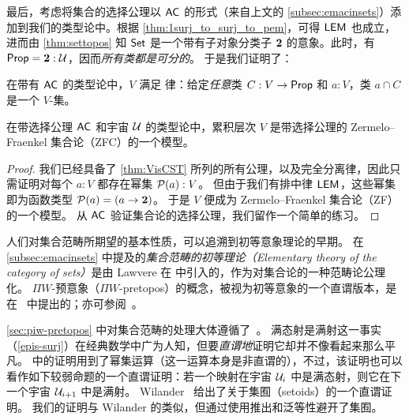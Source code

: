 最后，考虑将集合的选择公理以 $\mathsf{AC}_{}$ 的形式（来自上文的 \cref{subsec:emacinsets}）添加到我们的类型论中。根据 \cref{thm:1surj_to_surj_to_pem}，可得 $\mathsf{LEM}_{}$ 也成立，进而由 \cref{thm:settopos} 知 $\mathsf{Set}$ 是一个带有子对象分类子 $\mathbf{2}$ 的意象。此时，有 $\mathsf{Prop} = \mathbf{2}:\mathcal{U}$，因而\emph{所有类都是可分的}。
于是我们证明了：

\begin{lem}\label{lem:fullsep}
  在带有 $\mathsf{AC}_{}$ 的类型论中，$V$ 满足 
  律：给定\emph{任意}类 $C : V \to \mathsf{Prop}$ 和 $a : V$，类 $a \cap C$ 是一个 $V$-集。
\end{lem}

\begin{thm}\label{thm:zfc}
在带选择公理 $\mathsf{AC}_{}$ 和宇宙 $\mathcal{U}$ 的类型论中，累积层次 $V$ 是带选择公理的 Zermelo--Fraenkel 集合论（ZFC）的一个模型。
\end{thm}

\begin{proof}
我们已经具备了 \cref{thm:VisCST} 所列的所有公理，以及完全分离律，因此只需证明对每个 $a:V$ 都存在幂集 $\mathcal{P}(a):V$。
但由于我们有排中律 $\mathsf{LEM}_{}$，这些幂集即为函数类型 $\mathcal{P}(a) = (a\to\mathbf{2})$。
于是 $V$ 便成为 Zermelo--Fraenkel 集合论（ZF）的一个模型。
从 $\mathsf{AC}_{}$ 验证集合论的选择公理，我们留作一个简单的练习。
\end{proof}

%

\sectionNotes

人们对集合范畴所期望的基本性质，可以追溯到初等意象理论的早期。
在 \cref{subsec:emacinsets} 中提及的\emph{集合范畴的初等理论（Elementary theory of the category of sets）}是由 Lawvere 在 \cite{lawvere:etcs-long} 中引入的，作为对集合论的一种范畴论公理化。
%
$\Pi W$-预意象（$\Pi W$-pretopos）的概念，被视为初等意象的一个直谓版本，是在~\cite{MoerdijkPalmgren2002} 中提出的；亦可参阅~\cite{palmgren:cetcs}。

\cref{sec:piw-pretopos} 中对集合范畴的处理大体遵循了~\cite{RijkeSpitters}。
满态射是满射这一事实（\cref{epis-surj}）在经典数学中广为人知，但要\emph{直谓地}证明它却并不像看起来那么平凡。
%
\cite{Mines/R/R:1988} 中的证明用到了幂集运算（这一运算本身是非直谓的），不过，该证明也可以看作如下较弱命题的一个直谓证明：若一个映射在宇宙 $\mathcal{U}_i$ 中是满态射，则它在下一个宇宙 $\mathcal{U}_{i+1}$ 中是满射。
Wilander~\cite{Wilander2010} 给出了关于集囿（setoids）的一个直谓证明。
我们的证明与 Wilander 的类似，但通过使用推出和泛等性避开了集囿。

